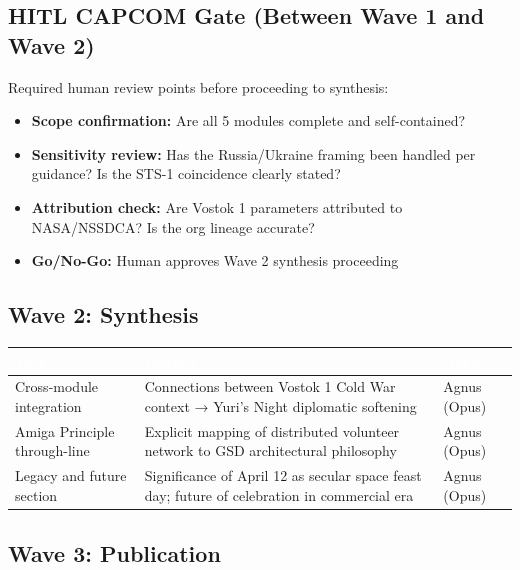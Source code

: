 \documentclass[11pt,letterpaper]{article}
\newcommand{\tableheader}[1]{\textbf{\sffamily\textcolor{white}{#1}}}
\begin{document}
\subsection{HITL CAPCOM Gate (Between Wave 1 and Wave 2)}

Required human review points before proceeding to synthesis:
\begin{itemize}[leftmargin=*]
  \item \textbf{Scope confirmation:} Are all 5 modules complete and self-contained?
  \item \textbf{Sensitivity review:} Has the Russia/Ukraine framing been handled per guidance? Is the STS-1 coincidence clearly stated?
  \item \textbf{Attribution check:} Are Vostok 1 parameters attributed to NASA/NSSDCA? Is the org lineage accurate?
  \item \textbf{Go/No-Go:} Human approves Wave 2 synthesis proceeding
\end{itemize}

\subsection{Wave 2: Synthesis}

\begin{center}
\begin{tabularx}{\textwidth}{L{4cm}XC{2cm}}
\toprule
{}
\tableheader{Task} & \tableheader{Output} & \tableheader{Agent} \\
\midrule
Cross-module integration & Connections between Vostok 1 Cold War context → Yuri's Night diplomatic softening & Agnus (Opus) \\
Amiga Principle through-line & Explicit mapping of distributed volunteer network to GSD architectural philosophy & Agnus (Opus) \\
Legacy and future section & Significance of April 12 as secular space feast day; future of celebration in commercial era & Agnus (Opus) \\
\bottomrule
\end{tabularx}
\end{center}

\subsection{Wave 3: Publication}
\end{document}
